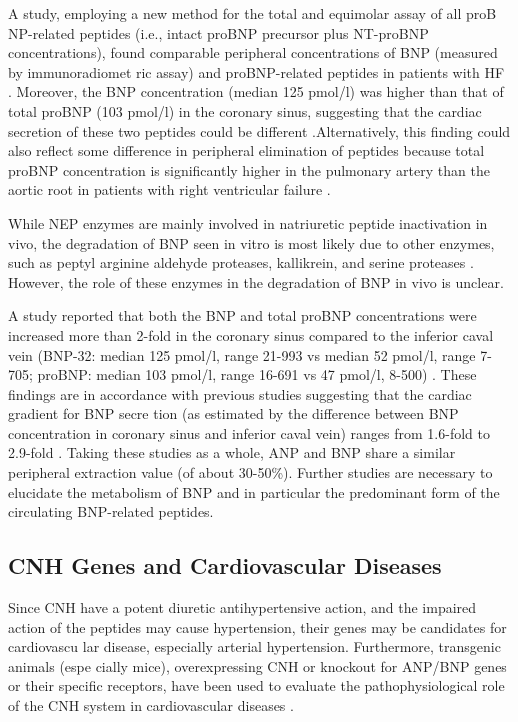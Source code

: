 \documentclass[14pt,a4paper,onecolumn]{extarticle}
\begin{document}
A  study, employing a new method for the total and equimolar assay of all proB NP-related peptides (i.e., intact proBNP precursor plus NT-proBNP concentrations), found comparable peripheral concentrations of BNP (measured by immunoradiomet ric assay) and proBNP-related peptides in patients with HF \citep{206}. Moreover, the BNP concentration (median 125 pmol/l) was higher than that of total proBNP (103 pmol/l) in the coronary sinus, suggesting that the cardiac secretion of these two peptides could be different \citep{206}.Alternatively, this finding could also reflect some difference in peripheral elimination of peptides because total proBNP concentration is significantly higher in the pulmonary artery than the aortic root in patients with right ventricular failure \citep{207}.

While NEP enzymes are mainly involved in natriuretic peptide inactivation in vivo, the degradation of BNP seen in vitro is most likely due to other enzymes, such as peptyl arginine aldehyde proteases, kallikrein, and serine proteases \citep{15}. However, the role of these enzymes in the degradation of BNP in vivo is unclear.

A  study reported that both the BNP and total proBNP concentrations were increased more than 2-fold in the coronary sinus compared to the inferior caval vein (BNP-32: median 125 pmol/l, range 21-993 vs median 52 pmol/l, range 7-705; proBNP: median 103 pmol/l, range 16-691 vs 47 pmol/l, 8-500) \citep{206}. These findings are in accordance with previous studies suggesting that the cardiac gradient for BNP secre tion (as estimated by the difference between BNP concentration in coronary sinus and inferior caval vein) ranges from 1.6-fold to 2.9-fold \citep{204} \citep{208} \citep{209} \citep{210}. Taking these studies as a whole, ANP and BNP share a similar peripheral extraction value (of about 30-50\%). Further studies are necessary to elucidate the metabolism of BNP and in particular the predominant form of the circulating BNP-related peptides.

\subsection{CNH Genes and Cardiovascular Diseases}
Since CNH have a potent diuretic antihypertensive action, and the impaired action of the peptides may cause hypertension, their genes may be candidates for cardiovascu lar disease, especially arterial hypertension. Furthermore, transgenic animals (espe cially mice), overexpressing CNH or knockout for ANP/BNP genes or their specific receptors, have been used to evaluate the pathophysiological role of the CNH system in cardiovascular diseases \citep{251}.
\end{document}
